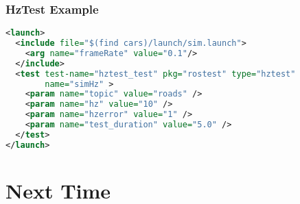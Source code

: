 \documentclass{beamer}
\begin{document}
\begin{frame}[fragile]
  \frametitle{HzTest Example}
  \begin{lstlisting}[style=code, language=xml, basicstyle=\ttfamily\scriptsize\color{white}]
<launch>
  <include file="$(find cars)/launch/sim.launch">
    <arg name="frameRate" value="0.1"/>
  </include>
  <test test-name="hztest_test" pkg="rostest" type="hztest" 
        name="simHz" >
    <param name="topic" value="roads" />  
    <param name="hz" value="10" />
    <param name="hzerror" value="1" />
    <param name="test_duration" value="5.0" />    
  </test>
</launch>
  \end{lstlisting}
\end{frame}

\section{Next Time}
\end{document}
